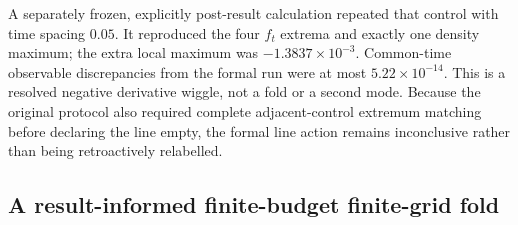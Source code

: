 \documentclass[aps,physrev,reprint,amsmath,amssymb,longbibliography,floatfix]{revtex4-2}
\begin{document}
A separately frozen, explicitly post-result calculation repeated that control
with time spacing $0.05$.  It reproduced the four $f_t$ extrema and exactly
one density maximum; the extra local maximum was
$-1.3837\times10^{-3}$.  Common-time observable discrepancies from the formal
run were at most $5.22\times10^{-14}$.  This is a resolved negative derivative
wiggle, not a fold or a second mode.  Because the original protocol also
required complete adjacent-control extremum matching before declaring the line
empty, the formal line action remains inconclusive rather than being
retroactively relabelled.

\subsection{A result-informed finite-budget finite-grid fold}
\end{document}

